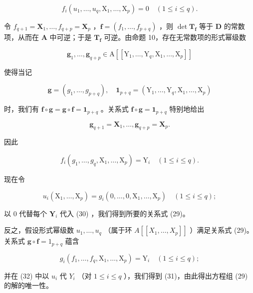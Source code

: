 \[
f _ {i} (u _ {1}, \dots , u _ {q}, \mathrm{X} _ {1}, \dots , \mathrm{X} _ {p}) = 0 \quad (1 \leqslant i \leqslant q).\tag{29}
\]

令 \(f_{q+1} = \mathbf{X}_1, \ldots, f_{q+p} = \mathbf{X}_p\) ，\(\mathbf{f} = (f_1, \ldots, f_{p+q})\) ，则 \(\det \mathbf{T}_{\mathbf{f}}\) 等于 \(\mathbf{D}\) 的常数项，从而在 \(\mathbf{A}\) 中可逆；于是 \(\mathbf{T}_{\mathbf{f}}\) 可逆。由命题 10，存在无常数项的形式幂级数

\[
\boldsymbol {g} _ {1}, \dots , \boldsymbol {g} _ {q + p} \in \mathrm{A} \left[ \left[ \mathrm{Y} _ {1}, \dots , \mathrm{Y} _ {q}, \mathrm{X} _ {1}, \dots , \mathrm{X} _ {p} \right] \right]
\]

使得当记

\[
\mathbf {g} = \left(g _ {1}, \dots , g _ {p + q}\right), \quad \mathbf {1} _ {p + q} = \left(\mathrm{Y} _ {1}, \dots , \mathrm{Y} _ {q}, \mathrm{X} _ {1}, \dots , \mathrm{X} _ {p}\right)
\]

时，我们有 \(\mathbf{f} \circ \mathbf{g} = \mathbf{g} \circ \mathbf{f} = \mathbf{1}_{p + q}\) 。关系式 \(\mathbf{f} \circ \mathbf{g} = \mathbf{1}_{p + q}\) 特别地给出

\[
\boldsymbol {g} _ {q + 1} = \mathbf {X} _ {1}, \dots , \boldsymbol {g} _ {q + p} = \mathbf {X} _ {p}.
\]

因此

\[
f _ {i} \left(g _ {1}, \dots , g _ {q}, \mathrm{X} _ {1}, \dots , \mathrm{X} _ {p}\right) = \mathrm{Y} _ {i} \quad (1 \leqslant i \leqslant q).\tag{30}
\]

现在令

\[
u _ {i} \left(\mathrm{X} _ {1}, \dots , \mathrm{X} _ {p}\right) = g _ {i} (0, \dots , 0, \mathrm{X} _ {1}, \dots , \mathrm{X} _ {p}) \quad (1 \leqslant i \leqslant q);\tag{31}
\]

以 0 代替每个 \(\mathbf{Y}_i\) 代入 (30) ，我们得到所要的关系式 (29)。

反之，假设形式幂级数 \(u_1, \ldots, u_q\) （属于环 \(A[[X_1, \ldots, X_p]]\) ）满足关系式 (29)。关系式 \(\mathbf{g} \circ \mathbf{f} = 1_{p + q}\) 蕴含

\[
g _ {i} (f _ {1}, \dots , f _ {q}, \mathrm{X} _ {1}, \dots , \mathrm{X} _ {p}) = \mathrm{Y} _ {i} \quad (1 \leqslant i \leqslant q);\tag{32}
\]

并在 (32) 中以 \(u_{i}\) 代 \(Y_{i}\) （对 \(1 \leqslant i \leqslant q\) ），我们得到 (31)，由此得出方程组 (29) 的解的唯一性。

